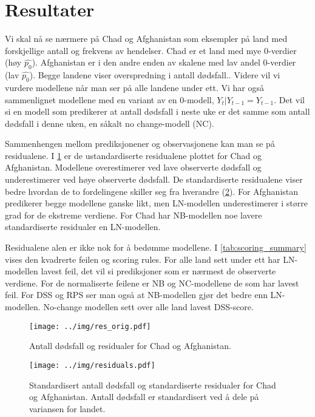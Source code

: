 \clearpage
\section{Resultater}

Vi skal nå se nærmere på Chad og Afghanistan som eksempler på land med
forskjellige antall og frekvens av hendelser. Chad er et land med mye 0-verdier
(høy $\hat{p_0}$). Afghanistan er i den andre enden av skalene med lav andel
0-verdier (lav $\hat{p_0}$). Begge landene viser overspredning i antall
dødsfall.. Videre vil vi vurdere modellene når man ser på alle landene under ett.
Vi har også sammenlignet modellene med en variant av en 0-modell, $Y_t|Y_{t-1}
= Y_{t-1}$. Det vil si en modell som predikerer at antall dødsfall i neste uke
er det samme som antall dødsfall i denne uken, en såkalt no change-modell (NC).

Sammenhengen mellom prediksjonener og observasjonene kan man se på
residualene. I \cref{fig:residuals_orig} er de ustandardiserte residualene
plottet for Chad og Afghanistan. Modellene overestimerer ved lave observerte
dødsfall og underestimerer ved høye observerte dødsfall. De standardiserte
residualene viser bedre hvordan de to fordelingene skiller seg fra hverandre
(\cref{fig:residuals}). For Afghanistan predikerer begge modellene ganske likt,
men LN-modellen underestimerer i større grad for de ekstreme verdiene. For Chad
har NB-modellen noe lavere standardiserte residualer en LN-modellen.  

Residualene alen er ikke nok for å bedømme modellene. I
\cref{tab:scoring_summary} vises den kvadrerte feilen og scoring rules. For
alle land sett under ett har LN-modellen lavest feil, det vil si prediksjoner
som er nærmest de observerte verdiene. For de normaliserte feilene er NB og
NC-modellene de som har lavest feil. For DSS og RPS ser man også at NB-modellen
gjør det bedre enn LN-modellen. No-change modellen sett over alle land lavest DSS-score.  

\begin{figure}[!h]
\centering
\texttt{[image: ../img/res\_orig.pdf]}
\caption{
    Antall dødsfall og residualer for Chad og Afghanistan.
    } 
\label{fig:residuals_orig}
\end{figure}

\begin{figure}[!h]
\centering
\texttt{[image: ../img/residuals.pdf]}
\caption{Standardisert antall dødsfall og standardiserte residualer for Chad og
    Afghanistan. Antall dødsfall er standardisert ved å dele på variansen for
    landet.} 
\label{fig:residuals}
\end{figure}

